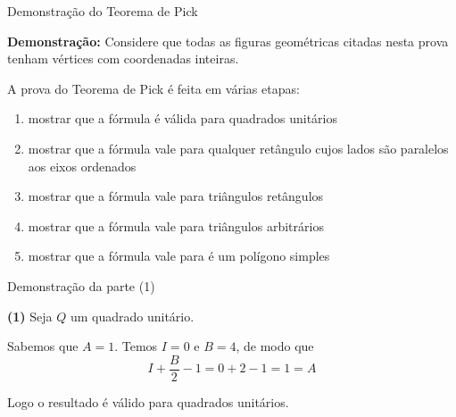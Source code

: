\begin{frame}[fragile]{Demonstração do Teorema de Pick}

    \textbf{Demonstração:} Considere que todas as figuras geométricas citadas nesta prova
         tenham vértices com coordenadas inteiras.

        A prova do Teorema de Pick é feita em várias etapas:
        \begin{enumerate}[(1)]
            \item mostrar que a fórmula é válida para quadrados unitários
            \item mostrar que a fórmula vale para qualquer retângulo cujos lados são paralelos
                aos eixos ordenados
            \item mostrar que a fórmula vale para triângulos retângulos
            \item mostrar que a fórmula vale para triângulos arbitrários
            \item mostrar que a fórmula vale para é um polígono simples
        \end{enumerate}
\end{frame}

\begin{frame}[fragile]{Demonstração da parte (1)}

    \textbf{(1)} Seja $Q$ um quadrado unitário.

    \begin{figure}
        \centering

    \end{figure}

    Sabemos que $A = 1$. Temos $I = 0$ e $B = 4$, de modo que
    \[
         I + \frac{B}{2} - 1 = 0 + 2 - 1 = 1 = A
    \]

    Logo o resultado é válido para quadrados unitários.
\end{frame}

